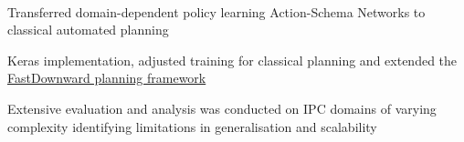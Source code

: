 \documentclass[]{lukas-cv-openfont}
\begin{document}

\noindent
{}
\\
\begin{tightitemize}{1.7em}
    \item Transferred domain-dependent policy learning Action-Schema Networks to
    classical automated planning
    \item Keras implementation, adjusted training for classical planning and extended the \href{http://www.fast-downward.org}{FastDownward planning framework}
    \item Extensive evaluation and analysis was conducted on IPC domains of varying complexity identifying
    limitations in generalisation and scalability
\end{tightitemize}
\largesectionsep
\end{document}

